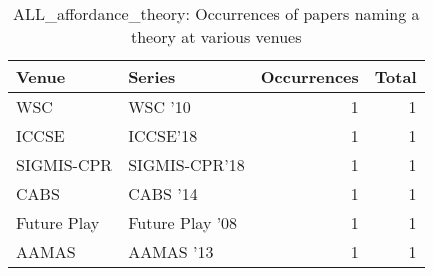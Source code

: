 \begin{table*}[t]
\begin{tabular}{llrr}
Venue & Series & Occurrences & Total\\\hline
\multirow{1}{*}{WSC } & WSC '10 & 1 & \multirow{1}{*}{1}\\
\multirow{1}{*}{ICCSE} & ICCSE'18 & 1 & \multirow{1}{*}{1}\\
\multirow{1}{*}{SIGMIS-CPR} & SIGMIS-CPR'18 & 1 & \multirow{1}{*}{1}\\
\multirow{1}{*}{CABS } & CABS '14 & 1 & \multirow{1}{*}{1}\\
\multirow{1}{*}{Future Play } & Future Play '08 & 1 & \multirow{1}{*}{1}\\
\multirow{1}{*}{AAMAS } & AAMAS '13 & 1 & \multirow{1}{*}{1}\\
\end{tabular}
\caption{ALL\_affordance\_theory: Occurrences of papers naming a theory at various venues}
\end{table*}